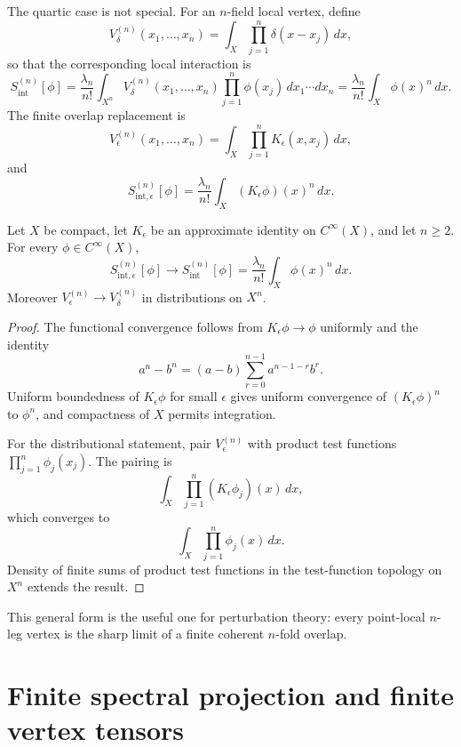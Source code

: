 \documentclass[11pt]{article}
\begin{document}
The quartic case is not special.  For an \(n\)-field local vertex, define
\[
V_{\delta}^{(n)}(x_1,\ldots,x_n)
=
\int_X\prod_{j=1}^{n}\delta(x-x_j)\,dx ,
\]
so that the corresponding local interaction is
\[
S_{\mathrm{int}}^{(n)}[\phi]
=
\frac{\lambda_n}{n!}
\int_{X^n}
V_{\delta}^{(n)}(x_1,\ldots,x_n)
\prod_{j=1}^{n}\phi(x_j)\,dx_1\cdots dx_n
=
\frac{\lambda_n}{n!}\int_X\phi(x)^n\,dx .
\]
The finite overlap replacement is
\[
V_{\epsilon}^{(n)}(x_1,\ldots,x_n)
=
\int_X\prod_{j=1}^{n}K_\epsilon(x,x_j)\,dx ,
\]
and
\[
S_{\mathrm{int},\epsilon}^{(n)}[\phi]
=
\frac{\lambda_n}{n!}\int_X (K_\epsilon\phi)(x)^n\,dx .
\]

\begin{proposition}
Let \(X\) be compact, let \(K_\epsilon\) be an approximate identity on \(C^\infty(X)\), and
let \(n\ge2\).  For every \(\phi\in C^\infty(X)\),
\[
S_{\mathrm{int},\epsilon}^{(n)}[\phi]
\longrightarrow
S_{\mathrm{int}}^{(n)}[\phi]
=
\frac{\lambda_n}{n!}\int_X\phi(x)^n\,dx .
\]
Moreover \(V_{\epsilon}^{(n)}\to V_{\delta}^{(n)}\) in distributions on \(X^n\).
\end{proposition}

\begin{proof}
The functional convergence follows from \(K_\epsilon\phi\to\phi\) uniformly and the identity
\[
a^n-b^n=(a-b)\sum_{r=0}^{n-1}a^{n-1-r}b^r .
\]
Uniform boundedness of \(K_\epsilon\phi\) for small \(\epsilon\) gives uniform convergence of
\((K_\epsilon\phi)^n\) to \(\phi^n\), and compactness of \(X\) permits integration.

For the distributional statement, pair \(V_{\epsilon}^{(n)}\) with product test functions
\(\prod_{j=1}^n\phi_j(x_j)\).  The pairing is
\[
\int_X\prod_{j=1}^n(K_\epsilon\phi_j)(x)\,dx,
\]
which converges to
\[
\int_X\prod_{j=1}^n\phi_j(x)\,dx.
\]
Density of finite sums of product test functions in the test-function topology on \(X^n\)
extends the result.
\end{proof}

This general form is the useful one for perturbation theory: every point-local \(n\)-leg
vertex is the sharp limit of a finite coherent \(n\)-fold overlap.

\section{Finite spectral projection and finite vertex tensors}
\end{document}
